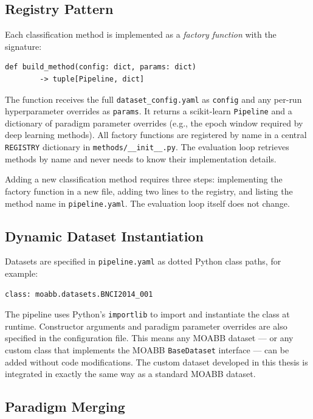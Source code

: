 \documentclass[english, bc, kiv, he, iso690alph, pdf]{fasthesis}
\begin{document}
\subsection{Registry Pattern}

Each classification method is implemented as a \textit{factory function} with the signature:

\begin{verbatim}
def build_method(config: dict, params: dict)
        -> tuple[Pipeline, dict]
\end{verbatim}

The function receives the full \texttt{dataset\_config.yaml} as \texttt{config} and any per-run hyperparameter overrides as \texttt{params}. It returns a scikit-learn \texttt{Pipeline} and a dictionary of paradigm parameter overrides (e.g., the epoch window required by deep learning methods). All factory functions are registered by name in a central \texttt{REGISTRY} dictionary in \texttt{methods/\_\_init\_\_.py}. The evaluation loop retrieves methods by name and never needs to know their implementation details.

Adding a new classification method requires three steps: implementing the factory function in a new file, adding two lines to the registry, and listing the method name in \texttt{pipeline.yaml}. The evaluation loop itself does not change.

\subsection{Dynamic Dataset Instantiation}

Datasets are specified in \texttt{pipeline.yaml} as dotted Python class paths, for example:

\begin{verbatim}
class: moabb.datasets.BNCI2014_001
\end{verbatim}

The pipeline uses Python's \texttt{importlib} to import and instantiate the class at runtime. Constructor arguments and paradigm parameter overrides are also specified in the configuration file. This means any MOABB dataset — or any custom class that implements the MOABB \texttt{BaseDataset} interface — can be added without code modifications. The custom dataset developed in this thesis is integrated in exactly the same way as a standard MOABB dataset.

\subsection{Paradigm Merging}
\end{document}
